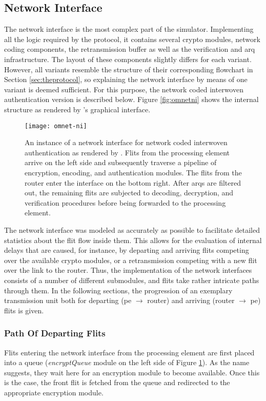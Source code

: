 \subsection{Network Interface}
The network interface is the most complex part of the simulator. Implementing all the logic required by the protocol, it contains several crypto
modules, network coding components, the retransmission buffer as well as the verification and \gls{arq} infrastructure. The layout of these components
slightly differs for each variant. However, all variants resemble the structure of their corresponding flowchart in Section \ref{sec:theprotocol}, so
explaining the network interface by means of one variant is deemed sufficient. For this purpose, the network coded interwoven authentication version
is described below. Figure \vref{fig:omnetni} shows the internal structure as rendered by \omnet{}'s graphical interface.

\begin{figure}
    \centering
    \texttt{[image: omnet-ni]}
    \caption[Simulator view of the network interface]{An instance of a network interface for network coded interwoven authentication as rendered by
    \omnet{}. Flits from the processing element arrive on the left side and subsequently traverse a pipeline of encryption, encoding, and
    authentication modules. The flits from the router enter the interface on the bottom right. After \glspl{arq} are filtered out, the remaining flits
    are subjected to decoding, decryption, and verification procedures before being forwarded to the processing element.}
    \label{fig:omnetni}
\end{figure}

The network interface was modeled as accurately as possible to facilitate detailed statistics about the flit flow inside them. This allows for the
evaluation of internal delays that are caused, for instance, by departing and arriving flits competing over the available crypto modules, or a
retransmission competing with a new flit over the link to the router. Thus, the implementation of the network interfaces consists of a number of
different submodules, and flits take rather intricate paths through them. In the following sections, the progression of an exemplary transmission unit
both for departing (\gls{pe} $\rightarrow$ router) and arriving (router $\rightarrow$ \gls{pe}) flits is given.

\subsubsection{Path Of Departing Flits}
Flits entering the network interface from the processing element are first placed into a queue (\textit{encryptQueue} module on the left side of
Figure \ref{fig:omnetni}). As the name suggests, they wait here for an encryption module to become available. Once this is the case, the front
flit is fetched from the queue and redirected to the appropriate encryption module.

